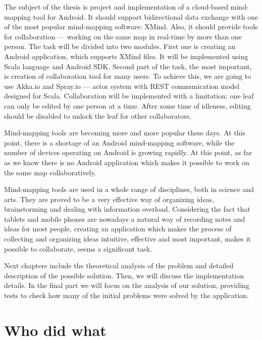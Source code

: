 The subject of the thesis is project and implementation of a cloud-based mind-mapping tool for Android. It should support bidirectional data exchange with one of the most popular mind-mapping software: XMind. Also, it should provide tools for collaboration --- working on the same map in real-time by more than one person. The task will be divided into two modules. First one is creating an Android application, which supports XMind files. It will be implemented using Scala language and Android SDK. Second part of the task, the most important, is creation of collaboration tool for many users. To achieve this, we are going to use Akka.io and Spray.io --- actor system with REST communication model designed for Scala. Collaboration will be implemented with a limitation: one leaf can only be edited by one person at a time. After some time of idleness, editing should be disabled to unlock the leaf for other collaborators.


Mind-mapping tools are becoming more and more popular these days. At this point, there is a shortage of an Android mind-mapping software, while the number of devices operating on Android is growing rapidly. At this point, as far as we know there is no Android application which makes it possible to work on the same map collaboratively.


Mind-mapping tools are used in a whole range of disciplines, both in science and arts. They are proved to be a very effective way of organizing ideas, brainstorming and dealing with information overload. Considering the fact that tablets and mobile phones are nowadays a natural way of recording notes and ideas for most people, creating an application which makes the process of collecting and organizing ideas intuitive, effective and most important, makes it possible to collaborate, seems a significant task.


Next chapters include the theoretical analysis of the problem and detailed description of the possible solution. Then, we will discuss the implementation details. In the final part we will focus on the analysis of our solution, providing tests to check how many of the initial problems were solved by the application.

\section{Who did what}
\label{sec:who-did-what}

